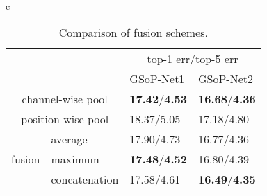 \documentclass[10pt,twocolumn,letterpaper]{article}
\begin{document}
\begin{table}[htb!]
\begin{tabular}{c}
		\begin{minipage}{1\linewidth}
			\begin{subtable}{1\linewidth}
				\centering
				\footnotesize
				\setlength{\tabcolsep}{5pt}
				\begin{tabular}{p{0.6cm}<{\centering}|p{1.5cm}<{\centering}|p{1.7cm}<{\centering}|p{1.7cm}<{\centering}}
					\hline
					\multicolumn{2}{c|}{\multirow{2}{*}{}}& \multicolumn{2}{c}{top-1 err$/$top-5 err}\\
					\cline{3-4}
					\multicolumn{2}{c|}{}&GSoP-Net1 &GSoP-Net2\\ 
					\hline
					\multicolumn{2}{c|}{channel-wise pool}& \textbf{17.42}$/$\textbf{4.53} & \textbf{16.68}$/$\textbf{4.36} \\
					\multicolumn{2}{c|}{position-wise pool}& 18.37$/$5.05 &17.18$/$4.80 \\
					\hline												
					\multirow{3}{*}{fusion}& average & 17.90$/$4.73 & 16.77$/$4.36  \\						
					& maximum & \textbf{17.48}$/$\textbf{4.52} & 16.80$/$4.39\\
					& concatenation &17.58$/$4.61 & \textbf{16.49}$/$\textbf{4.35} \\						
					\hline
				\end{tabular}%
				\setlength{\abovecaptionskip}{1.5pt}
				\setlength{\belowcaptionskip}{4pt}
				\caption{Comparison of fusion schemes. }\label{subtab:fusion}
			\end{subtable}%
		\end{minipage} \\
		

\end{tabular}
\end{table}
\end{document}
